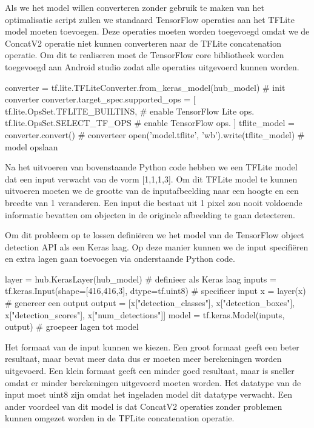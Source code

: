 Als we het model willen converteren zonder gebruik te maken van het optimalisatie script zullen we standaard TensorFlow operaties aan het TFLite model moeten toevoegen.
Deze operaties moeten worden toegevoegd omdat we de ConcatV2 operatie niet kunnen converteren naar de TFLite concatenation operatie.
Om dit te realiseren moet de TensorFlow core bibliotheek worden toegevoegd aan Android studio zodat alle operaties uitgevoerd kunnen worden.

\begin{python}
converter = tf.lite.TFLiteConverter.from_keras_model(hub_model) # init converter
converter.target_spec.supported_ops = [
    tf.lite.OpsSet.TFLITE_BUILTINS, # enable TensorFlow Lite ops.
    tf.lite.OpsSet.SELECT_TF_OPS # enable TensorFlow ops.
]
tflite_model = converter.convert() # converteer
open('model.tflite', 'wb').write(tflite_model) # model opslaan
\end{python}

Na het uitvoeren van bovenstaande Python code hebben we een TFLite model dat een input verwacht van de vorm [1,1,1,3].
Om dit TFLite model te kunnen uitvoeren moeten we de grootte van de inputafbeelding naar een hoogte en een breedte van 1 veranderen.
Een input die bestaat uit 1 pixel zou nooit voldoende informatie bevatten om objecten in de originele afbeelding te gaan detecteren.

Om dit probleem op te lossen defini\"eren we het model van de TensorFlow object detection API als een Keras laag.
Op deze manier kunnen we de input specifi\"eren en extra lagen gaan toevoegen via onderstaande Python code.

\begin{python} \label{testref}
layer = hub.KerasLayer(hub_model) # definieer als Keras laag
inputs = tf.keras.Input(shape=[416,416,3], dtype=tf.uint8) # specifieer input
x = layer(x) # genereer een output
output = [x["detection_classes"], x["detection_boxes"], x["detection_scores"], x["num_detections"]]
model = tf.keras.Model(inputs, output) # groepeer lagen tot model
\end{python}

Het formaat van de input kunnen we kiezen.
Een groot formaat geeft een beter resultaat, maar bevat meer data dus er moeten meer berekeningen worden uitgevoerd.
Een klein formaat geeft een minder goed resultaat, maar is sneller omdat er minder berekeningen uitgevoerd moeten worden.
Het datatype van de input moet uint8 zijn omdat het ingeladen model dit datatype verwacht.
Een ander voordeel van dit model is dat ConcatV2 operaties zonder problemen kunnen omgezet worden in de TFLite concatenation operatie.

